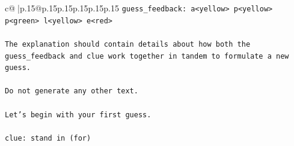 \documentclass{article}
\begin{document}
{\begin{supertabular}{c@{$\;$}|p{.15\linewidth}@{}p{.15\linewidth}p{.15\linewidth}p{.15\linewidth}p{.15\linewidth}p{.15\linewidth}}
{{{\texttt{guess\_feedback: a<yellow> p<yellow> p<green> l<yellow> e<red>} \\
\\ 
\texttt{The explanation should contain details about how both the guess\_feedback and clue work together in tandem to formulate a new guess.} \\
\\ 
\texttt{Do not generate any other text.} \\
\\ 
\texttt{Let's begin with your first guess.} \\
\\ 
\texttt{clue: stand in (for)} \\
            }
        }
    }
     \\ \\


\end{supertabular}}
\end{document}
